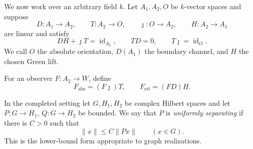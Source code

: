 \documentclass[11pt]{article}
\theoremstyle{definition}
\theoremstyle{remark}
\newcommand{\id}{\operatorname{id}}
\begin{document}
We now work over an arbitrary field \(k\).  Let \(A_1,A_2,O\) be
\(k\)-vector spaces and suppose
\[
 D:A_1\to A_2,\qquad T:A_2\to O,\qquad
 \jmath:O\to A_2,\qquad H:A_2\to A_1
\tag{2.1}\label{eq:green-data}
\]
are linear and satisfy
\[
 DH+\jmath T=\id_{A_2},\qquad TD=0,
 \qquad T\jmath=\id_O.
\tag{2.2}\label{eq:green-identities}
\]
We call \(O\) the absolute orientation, \(D(A_1)\) the boundary channel,
and \(H\) the chosen Green lift.

For an observer \(F:A_2\to W\), define
\[
 F_{\mathrm{abs}}=(F\jmath)T,
 \qquad
 F_{\mathrm{rel}}=(FD)H.
\tag{2.3}\label{eq:observer-parts}
\]

In the completed setting let \(G,H_1,H_2\) be complex Hilbert spaces and
let \(P:G\to H_1\), \(Q:G\to H_2\) be bounded.  We say that \(P\) is
\emph{uniformly separating} if there is \(C>0\) such that
\[
                         \|x\|\le C\|Px\|
                         \qquad(x\in G).
\tag{2.4}\label{eq:lower-bound}
\]
This is the lower-bound form appropriate to graph realizations.
\end{document}
